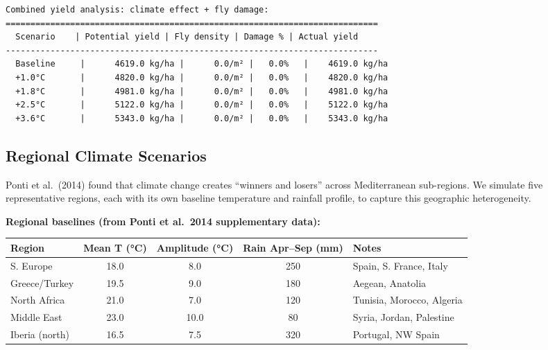 \begin{verbatim}
Combined yield analysis: climate effect + fly damage:
===========================================================================
  Scenario    | Potential yield | Fly density | Damage % | Actual yield
---------------------------------------------------------------------------
  Baseline     |      4619.0 kg/ha |      0.0/m² |   0.0%   |    4619.0 kg/ha
  +1.0°C       |      4820.0 kg/ha |      0.0/m² |   0.0%   |    4820.0 kg/ha
  +1.8°C       |      4981.0 kg/ha |      0.0/m² |   0.0%   |    4981.0 kg/ha
  +2.5°C       |      5122.0 kg/ha |      0.0/m² |   0.0%   |    5122.0 kg/ha
  +3.6°C       |      5343.0 kg/ha |      0.0/m² |   0.0%   |    5343.0 kg/ha
\end{verbatim}



\subsection{Regional Climate Scenarios}



\label{3526424379899394965}{}


Ponti et al.~(2014) found that climate change creates “winners and losers” across Mediterranean sub-regions. We simulate five representative regions, each with its own baseline temperature and rainfall profile, to capture this geographic heterogeneity.



\textbf{Regional baselines (from Ponti et al.~2014 supplementary data):}




\begin{table}[h]
\centering
\begin{tabulary}{\linewidth}{L C C C L}
\toprule
Region & Mean T (°C) & Amplitude (°C) & Rain Apr–Sep (mm) & Notes \\
\toprule
S. Europe & 18.0 & 8.0 & 250 & Spain, S. France, Italy \\
Greece/Turkey & 19.5 & 9.0 & 180 & Aegean, Anatolia \\
North Africa & 21.0 & 7.0 & 120 & Tunisia, Morocco, Algeria \\
Middle East & 23.0 & 10.0 & 80 & Syria, Jordan, Palestine \\
Iberia (north) & 16.5 & 7.5 & 320 & Portugal, NW Spain \\
\bottomrule
\end{tabulary}

\end{table}




